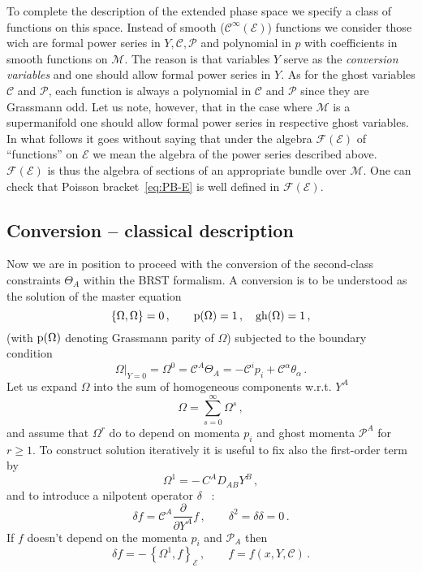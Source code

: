 \documentclass[a4paper,11pt]{amsart}
\numberwithin{thm}{section} %
\numberwithin{equation}{section} %
\numberwithin{figure}{section} %
\newcommand{\pb}[2]{\left\{{}#1{},{}#2{}\right\}}
\newcommand{\gh}[1]{{\rm gh}(#1)}
\newcommand{\p}[1]{{\rm p}(#1)}
\renewcommand{\:}{{\rm\, :\,}}
\newcommand{\func}[1]{{{\mathcal C}^\infty}{(#1)}}             %
\def\d{\partial}
\newcommand{\dl}[1]{\displaystyle\frac{{\d}}{\d #1}}
\def\cP{{\mathcal P}}
\def\cc{{\mathcal C}}
\def\cF{{\mathcal F}}
\def\manM{{\mathcal M}}
\def\E{{ \mathcal E}}
\begin{document}
To complete the description of the extended phase space
we specify a class of functions on this space.
Instead of smooth ($\func{\E}$) functions we consider
those wich are formal power series in $Y,\cc,\cP$ and
polynomial in $p$ with coefficients in smooth functions
on $\manM$.  The reason is that variables $Y$ serve as the \textit{conversion
variables} and one should allow formal power series in $Y$.  As for
the ghost variables $\cc$ and $\cP$, each function is always a
polynomial in $\cc$ and $\cP$ since they are Grassmann odd. Let us
note, however, that in the case where $\manM$ is a supermanifold one
should allow formal power series in respective ghost variables.  In
what follows it goes without saying that under the algebra $\cF(\E)$
of ``functions'' on $\E$ we mean the algebra of the power series described
above. $\cF(\E)$ is thus the algebra of sections of an appropriate
bundle over $\manM$.  One can check that Poisson
bracket~\eqref{eq:PB-E} is well defined in $\cF(\E)$.

\subsection{Conversion -- classical description}

Now we are in position to proceed with the conversion
of the second-class constraints $\Theta_A$ within the BRST
formalism.  A conversion is to be understood as
the solution of the master equation
\begin{equation}
  \label{eq:master-cl}
  \pb{\Omega}{\Omega}=0\,, \qquad \p{\Omega}=1\,, \quad \gh{\Omega}=1\,,
\end{equation}
(with $\p{\Omega}$ denoting Grassmann parity of $\Omega$)
subjected to the boundary condition
\begin{equation}
\label{eq:boundary-cl}
\Omega|_{Y=0}=\Omega^0=\cc^A\Theta_A=-\cc^ip_i+\cc^\alpha\theta_\alpha\,.
\end{equation}
Let us expand $\Omega$ into the sum of homogeneous
components w.r.t. $Y^A$
\begin{equation}
  \Omega=\sum_{s=0}^\infty \Omega^s\,,
\end{equation}
and assume
that $\Omega^r$ do to depend on momenta $p_i$ and ghost
momenta $\cP^A$ for $r \geq 1$.  To construct solution iteratively it is useful to
fix also the first-order term by
\begin{equation}
  \label{eq:1-2-terms}
\Omega^1 = -\,C^A D_{AB}Y^B\,,
\end{equation}
and to introduce a nilpotent operator $\delta$
~\cite{[BT],[Fedosov-JDG],[GL]}:
\begin{equation}
  \delta f = \cc^A\dl{Y^A} f\,,\qquad  \delta^2=\delta\delta=0\,.
\end{equation}
If $f$ doesn't depend on the momenta $p_i$ and $\cP_A$ then
\begin{equation}
  \delta f = -\,\pb{\Omega^1}{f}_\E\,,  \qquad f=f(x,Y,\cc)\,.
\end{equation}
\end{document}
